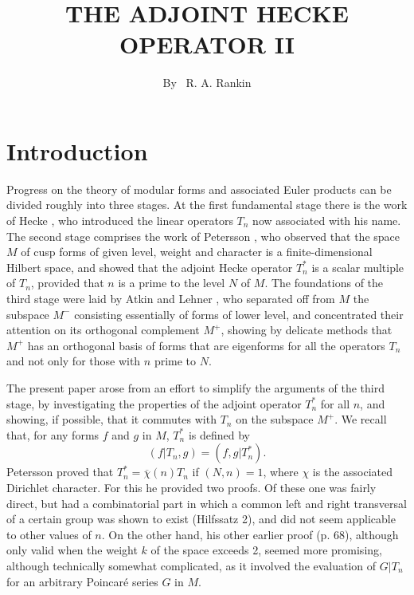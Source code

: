 \title{THE ADJOINT HECKE OPERATOR II}

\author{By~ R. A. Rankin}

\date{}
\maketitle

\setcounter{pageoriginal}{160}
\section{Introduction}\label{art10-sec1}
\pageoriginale
Progress on the theory of modular forms and associated Euler products can be divided roughly into three stages. At the first fundamental stage there is the work of Hecke \cite{art10-key3}, who introduced the linear operators $T_{n}$ now associated with his name. The second stage comprises the work of Petersson \cite{art10-key8}, who observed that the space $M$ of cusp forms of given level, weight and character is a finite-dimensional Hilbert space, and showed that the adjoint Hecke operator $T^{*}_{n}$ is a scalar multiple of $T_{n}$, provided that $n$ is a prime to the level $N$ of $M$. The foundations of the third stage were laid by Atkin and Lehner \cite{art10-key1}, who separated off from $M$ the subspace $M^{-}$ consisting essentially of forms of lower level, and concentrated their attention on its orthogonal complement $M^{+}$, showing by delicate methods that $M^{+}$ has an orthogonal basis of forms that are eigenforms for all the operators $T_{n}$ and not only for those with $n$ prime to $N$.

The present paper arose from an effort to simplify the arguments of the third stage, by investigating the properties of the adjoint operator $T^{*}_{n}$ for all $n$, and showing, if possible, that it commutes with $T_{n}$ on the subspace $M^{+}$. We recall that, for any forms $f$ and $g$ in $M$, $T^{*}_{n}$ is defined by
\begin{equation}
(f|T_{n},g)=(f,g|T^{*}_{n}).\label{art10-eq1.1}
\end{equation}
Petersson proved that $T^{*}_{n}=\overline{\chi}(n)T_{n}$ if $(N,n)=1$, where $\chi$ is the associated Dirichlet character. For this he provided two proofs. Of these one \cite{art10-key8} was fairly direct, but had a combinatorial part in which a common left and right transversal of a certain group was shown to exist (Hilfssatz 2), and did not seem applicable to other values of $n$. On the other hand, his other earlier proof \cite{art10-key7} (p. 68), although only valid when the weight $k$ of the space exceeds 2, seemed more promising, although technically somewhat complicated, as it involved the evaluation of $G|T_{n}$ for an arbitrary Poincar\'e series $G$ in $M$.

